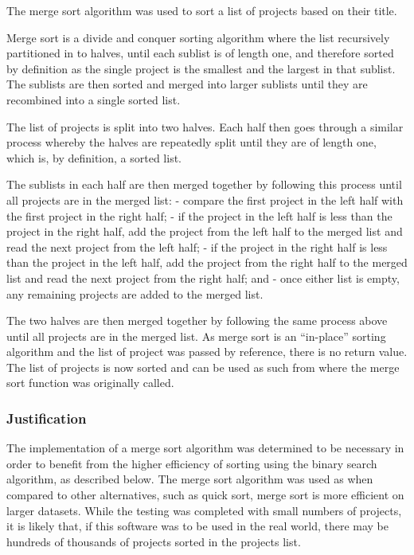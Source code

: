 \documentclass[
  english,
  a4paper,
,tablecaptionabove
]{scrartcl}
\begin{document}
The merge sort algorithm was used to sort a list of projects based on
their title.

Merge sort is a divide and conquer sorting algorithm where the list
recursively partitioned in to halves, until each sublist is of length
one, and therefore sorted by definition as the single project is the
smallest and the largest in that sublist. The sublists are then sorted
and merged into larger sublists until they are recombined into a single
sorted list.

The list of projects is split into two halves. Each half then goes
through a similar process whereby the halves are repeatedly split until
they are of length one, which is, by definition, a sorted list.

The sublists in each half are then merged together by following this
process until all projects are in the merged list: - compare the first
project in the left half with the first project in the right half; - if
the project in the left half is less than the project in the right half,
add the project from the left half to the merged list and read the next
project from the left half; - if the project in the right half is less
than the project in the left half, add the project from the right half
to the merged list and read the next project from the right half; and -
once either list is empty, any remaining projects are added to the
merged list.

The two halves are then merged together by following the same process
above until all projects are in the merged list. As merge sort is an
\enquote{in-place} sorting algorithm and the list of project was passed
by reference, there is no return value. The list of projects is now
sorted and can be used as such from where the merge sort function was
originally called.

\hypertarget{justification}{%
\subsubsection{Justification}\label{justification}}

The implementation of a merge sort algorithm was determined to be
necessary in order to benefit from the higher efficiency of sorting
using the binary search algorithm, as described below. The merge sort
algorithm was used as when compared to other alternatives, such as quick
sort, merge sort is more efficient on larger datasets. While the testing
was completed with small numbers of projects, it is likely that, if this
software was to be used in the real world, there may be hundreds of
thousands of projects sorted in the projects list.
\end{document}
